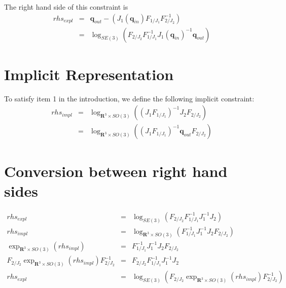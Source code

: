 \documentclass {article}
\newcommand\conf{\mathbf{q}}
\newcommand\reals{\mathbf{R}}
\begin{document}
The right hand side of this constraint is
\begin {eqnarray}
  rhs_{expl} &=& \conf_{out} - ({J_1} (\conf_{in})F_{1/J_1} F_{2/J_2}^{-1})\\
  \label{explicit-rhs}
  &=& \log_{SE(3)} \left(F_{2/J_2} F_{1/J_1}^{-1} {J_1} (\conf_{in})^{-1} \conf_{out}\right)
\end {eqnarray}

\section {Implicit Representation}

To satisfy item 1 in the introduction, we define the following implicit constraint:
\begin {eqnarray}
  rhs_{impl} &=& \log_{\reals^3\times SO(3)} \left((J_1 F_{1/J_1})^{-1}J_2 F_{2/J_2}\right)\\
  &=&\log_{\reals^3\times SO(3)} \left((J_1 F_{1/J_1})^{-1}\conf_{out} F_{2/J_2}\right)
\end {eqnarray}

\section {Conversion between right hand sides}

\begin {eqnarray*}
rhs_{expl} &=& \log_{SE(3)} \left(F_{2/J_2} F_{1/J_1}^{-1} J_1^{-1} J_2\right)\\
rhs_{impl} &=& \log_{\reals^3\times SO(3)} \left(F_{1/J_1}^{-1} J_1^{-1}J_2 F_{2/J_2}\right)\\
\exp_{\reals^3\times SO(3)} (rhs_{impl}) &=&  F_{1/J_1}^{-1} J_1^{-1}J_2 F_{2/J_2} \\
F_{2/J_2}\exp_{\reals^3\times SO(3)} (rhs_{impl})  F_{2/J_2}^{-1} &=&  F_{2/J_2} F_{1/J_1}^{-1} J_1^{-1}J_2\\
rhs_{expl} &=& \log_{SE(3)}\left(F_{2/J_2}\exp_{\reals^3\times SO(3)} (rhs_{impl})  F_{2/J_2}^{-1}\right)
\end {eqnarray*}
\end{document}
